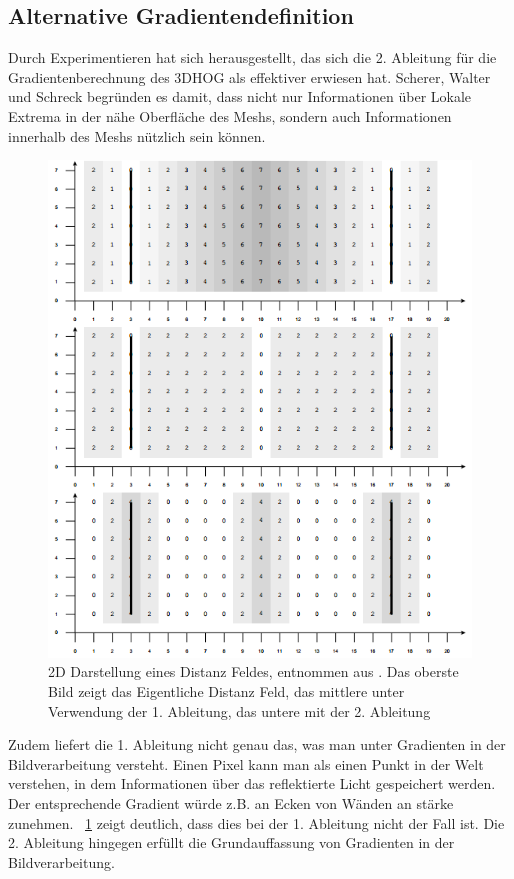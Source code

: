 \subsection{Alternative Gradientendefinition}
Durch Experimentieren hat sich herausgestellt, das sich die 2. Ableitung für die Gradientenberechnung des 3DHOG als effektiver erwiesen hat. Scherer, Walter und Schreck \cite{scherer2010histograms} begründen es damit, dass nicht nur Informationen über Lokale Extrema in der nähe Oberfläche des Meshs, sondern auch Informationen innerhalb des Meshs nützlich sein können. 
 \begin{figure}[thpb]
 	\centering
 	\includegraphics[width=\linewidth]{3-Diskussion/pics/2D_distance_field.png}
 	\caption{2D Darstellung eines Distanz Feldes, entnommen aus \cite{scherer2010histograms}. Das oberste Bild zeigt das Eigentliche Distanz Feld, das mittlere unter Verwendung der 1. Ableitung, das untere mit der 2. Ableitung}
 	\label{2D_distance_field}
 \end{figure}
 Zudem liefert die 1. Ableitung nicht genau das, was man unter Gradienten in der Bildverarbeitung versteht. Einen Pixel kann man als einen Punkt in der Welt verstehen, in dem Informationen über das reflektierte Licht gespeichert werden. Der entsprechende Gradient würde z.B. an Ecken von Wänden an stärke zunehmen. \figurename~\ref{2D_distance_field} zeigt deutlich, dass dies bei der 1. Ableitung nicht der Fall ist. Die 2. Ableitung hingegen erfüllt die Grundauffassung von Gradienten in der Bildverarbeitung.
 \newline
 
 